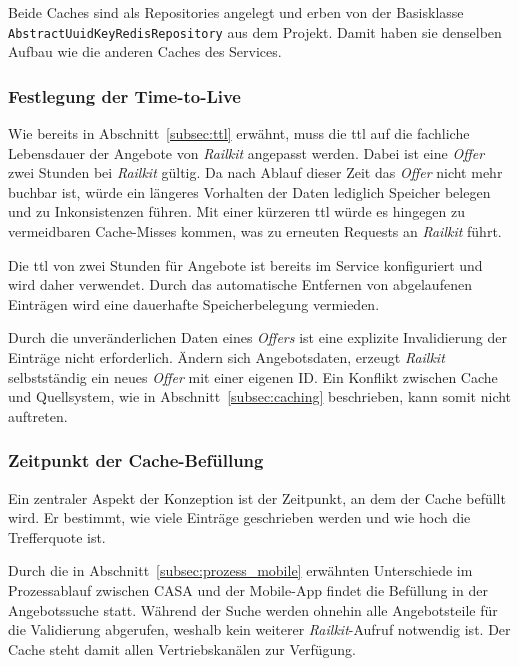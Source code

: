 Beide Caches sind als Repositories angelegt und erben von der Basisklasse \texttt{AbstractUuidKeyRedisRepository} aus dem Projekt. Damit haben sie denselben Aufbau wie die anderen Caches des Services.

\subsubsection{Festlegung der Time-to-Live}
\label{subsubsec:ttl_konzeption}

Wie bereits in Abschnitt~\ref{subsec:ttl} erwähnt, muss die \ac{ttl} auf die fachliche Lebensdauer der Angebote von \textit{Railkit} angepasst werden. Dabei ist eine \textit{Offer} zwei Stunden bei \textit{Railkit} gültig. %
Da nach Ablauf dieser Zeit das \textit{Offer} nicht mehr buchbar ist, würde ein längeres Vorhalten der Daten lediglich Speicher belegen und zu Inkonsistenzen führen. Mit einer kürzeren \ac{ttl} würde es hingegen zu vermeidbaren Cache-Misses kommen, was zu erneuten Requests an \textit{Railkit} führt.

Die \ac{ttl} von zwei Stunden für Angebote ist bereits im Service konfiguriert und wird daher verwendet. Durch das automatische Entfernen von abgelaufenen Einträgen wird eine dauerhafte Speicherbelegung vermieden.

Durch die unveränderlichen Daten eines \textit{Offers} ist eine explizite Invalidierung der Einträge nicht erforderlich. Ändern sich Angebotsdaten, erzeugt \textit{Railkit} selbstständig ein neues \textit{Offer} mit einer eigenen ID. Ein Konflikt zwischen Cache und Quellsystem, wie in Abschnitt~\ref{subsec:caching} beschrieben, kann somit nicht auftreten.

\subsubsection{Zeitpunkt der Cache-Befüllung}
\label{subsubsec:befuellung}

Ein zentraler Aspekt der Konzeption ist der Zeitpunkt, an dem der Cache befüllt wird. Er bestimmt, wie viele Einträge geschrieben werden und wie hoch die Trefferquote ist.

Durch die in Abschnitt~\ref{subsec:prozess_mobile} erwähnten Unterschiede im Prozessablauf zwischen CASA und der Mobile-App findet die Befüllung in der Angebotssuche statt. Während der Suche werden ohnehin alle Angebotsteile für die Validierung abgerufen, weshalb kein weiterer \textit{Railkit}-Aufruf notwendig ist. Der Cache steht damit allen Vertriebskanälen zur Verfügung.

